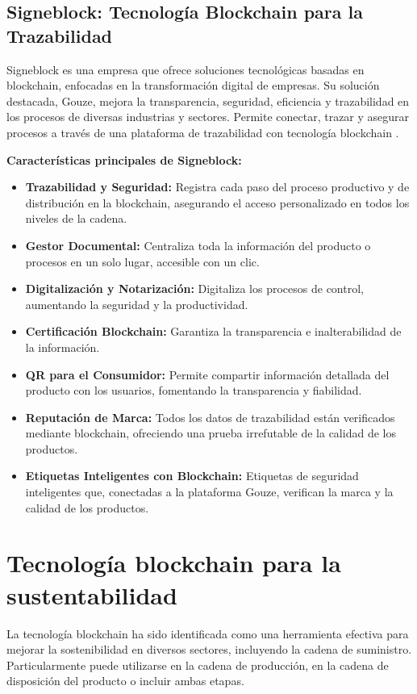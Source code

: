 \documentclass[main.tex]{subfiles}
\begin{document}
\subsection{Signeblock: Tecnología Blockchain para la Trazabilidad}

Signeblock es una empresa que ofrece soluciones tecnológicas basadas en blockchain, enfocadas en la transformación digital de empresas. Su solución destacada, Gouze, mejora la transparencia, seguridad, eficiencia y trazabilidad en los procesos de diversas industrias y sectores. Permite conectar, trazar y asegurar procesos a través de una plataforma de trazabilidad con tecnología blockchain \cite{signeblock2024}.

\textbf{Características principales de Signeblock:}
\begin{itemize}
  \item \textbf{Trazabilidad y Seguridad:} Registra cada paso del proceso productivo y de distribución en la blockchain, asegurando el acceso personalizado en todos los niveles de la cadena.
  \item \textbf{Gestor Documental:} Centraliza toda la información del producto o procesos en un solo lugar, accesible con un clic.
  \item \textbf{Digitalización y Notarización:} Digitaliza los procesos de control, aumentando la seguridad y la productividad.
  \item \textbf{Certificación Blockchain:} Garantiza la transparencia e inalterabilidad de la información.
  \item \textbf{QR para el Consumidor:} Permite compartir información detallada del producto con los usuarios, fomentando la transparencia y fiabilidad.
  \item \textbf{Reputación de Marca:} Todos los datos de trazabilidad están verificados mediante blockchain, ofreciendo una prueba irrefutable de la calidad de los productos.
  \item \textbf{Etiquetas Inteligentes con Blockchain:} Etiquetas de seguridad inteligentes que, conectadas a la plataforma Gouze, verifican la marca y la calidad de los productos.
\end{itemize}

\section{Tecnología blockchain para la sustentabilidad}

La tecnología blockchain ha sido identificada como una herramienta efectiva para mejorar la sostenibilidad en diversos sectores, incluyendo la cadena de suministro. Particularmente puede utilizarse en la cadena de producción, en la cadena de disposición del producto o incluir ambas etapas. 
\end{document}
